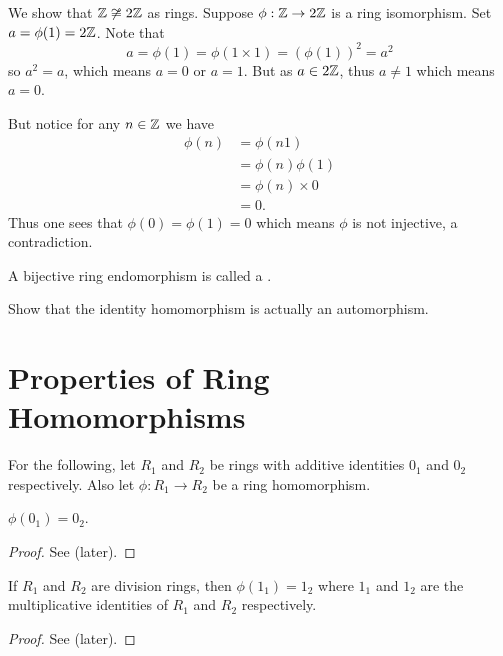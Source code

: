 \begin{example}
    We show that $\mathbb{Z} \not\cong 2\mathbb{Z}$ as rings. Suppose $\phi: \mathbb{Z} \to 2\mathbb{Z}$ is a ring isomorphism. Set $a = \phi(1) = 2\mathbb{Z}$. Note that
    \[
        a = \phi(1) = \phi(1\times1) = (\phi(1))^2 = a^2
    \]
    so $a^2 = a$, which means $a = 0$ or $a = 1$. But as $a \in 2\mathbb{Z}$, thus $a \neq 1$ which means $a = 0$.

    But notice for any $n \in \mathbb{Z}$ we have
    \begin{align*}
        \phi(n) &= \phi(n1)\\
        &= \phi(n)\phi(1)\\
        &= \phi(n) \times 0\\
        &= 0.
    \end{align*}
    Thus one sees that $\phi(0) = \phi(1) = 0$ which means $\phi$ is not injective, a contradiction.
\end{example}

\begin{definition}
    A bijective ring endomorphism is called a .
\end{definition}

\begin{exercise}\label{exercise-identity-homomorphism-is-an-isomorphism}
    Show that the identity homomorphism is actually an automorphism.
\end{exercise}

\section{Properties of Ring Homomorphisms}
For the following, let $R_1$ and $R_2$ be rings with additive identities $0_1$ and $0_2$ respectively. Also let $\phi: R_1 \to R_2$ be a ring homomorphism.

\begin{proposition}\label{prop-ring-image-of-additive-identity-is-additive-identity}
    $\phi(0_1) = 0_2$.
\end{proposition}
\begin{proof}
    See  (later).
\end{proof}

\begin{proposition}
    If $R_1$ and $R_2$ are division rings, then $\phi(1_1) = 1_2$ where $1_1$ and $1_2$ are the multiplicative identities of $R_1$ and $R_2$ respectively.
\end{proposition}
\begin{proof}
    See  (later).
\end{proof}

